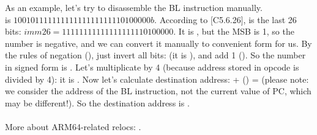 As an example, let's try to disassemble the BL instruction manually.\\
 is $10010111111111111111111110100000b$.
According to [\ARMSixFourRef C5.6.26],  is the last 26 bits: $imm26 = 11111111111111111110100000$.
It is , but the \ac{MSB} is 1, 
so the number is negative, and we can convert it manually to convenient form for us.
By the rules of negation (), just invert all bits: (it is ), and add 1 ().
So the number in signed form is .
Let's multiplicate  by 4 (because address stored in opcode is divided by 4): it is .
Now let's calculate destination address:  + () =  
(please note: we consider the address of the BL instruction, not the current value of \ac{PC}, which may be different!).
So the destination address is .\\
\\
More about ARM64-related relocs: \ARMELF.
